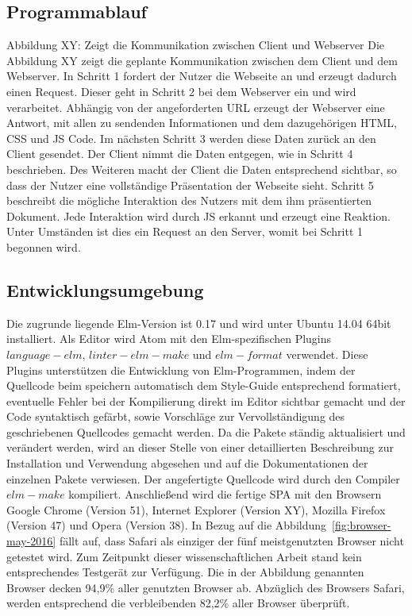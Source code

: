 \subsection{Programmablauf}
\label{sec:Programmablauf}
Abbildung XY: Zeigt die Kommunikation zwischen Client und Webserver
Die Abbildung XY zeigt die geplante Kommunikation zwischen dem Client und dem Webserver.
In Schritt 1 fordert der Nutzer die Webseite an und erzeugt dadurch einen Request. Dieser geht in Schritt 2 bei dem Webserver ein und wird verarbeitet. Abhängig von der angeforderten URL erzeugt der Webserver eine Antwort, mit allen zu sendenden Informationen und dem dazugehörigen \ac{HTML}, \ac{CSS} und \ac{JS} Code. Im nächsten Schritt 3 werden diese Daten zurück an den Client gesendet. Der Client nimmt die Daten entgegen, wie in Schritt 4 beschrieben. Des Weiteren macht der Client die Daten entsprechend sichtbar, so dass der Nutzer eine vollständige Präsentation der Webseite sieht. Schritt 5 beschreibt die mögliche Interaktion des Nutzers mit dem ihm präsentierten Dokument. Jede Interaktion wird durch \ac{JS} erkannt und erzeugt eine Reaktion. Unter Umständen ist dies ein Request an den Server, womit bei Schritt 1 begonnen wird.


\subsection{Entwicklungsumgebung}
\label{sec:Entwicklungsumgebung}
Die zugrunde liegende Elm-Version ist 0.17 und wird unter Ubuntu 14.04 64bit installiert. Als Editor wird Atom mit den Elm-spezifischen Plugins $language-elm$, $linter-elm-make$ und $elm-format$ verwendet. Diese Plugins unterstützen die Entwicklung von Elm-Programmen, indem der Quellcode beim speichern automatisch dem Style-Guide entsprechend formatiert, eventuelle Fehler bei der Kompilierung direkt im Editor sichtbar gemacht und der Code syntaktisch gefärbt, sowie Vorschläge zur Vervollständigung des geschriebenen Quellcodes gemacht werden. Da die Pakete ständig aktualisiert und verändert werden, wird an dieser Stelle von einer detaillierten Beschreibung zur Installation und Verwendung abgesehen und auf die Dokumentationen der einzelnen Pakete verwiesen.
Der angefertigte Quellcode wird durch den Compiler $elm-make$ kompiliert.
Anschließend wird die fertige \ac{SPA} mit den Browsern Google Chrome (Version 51), Internet Explorer (Version XY), Mozilla Firefox (Version 47) und Opera (Version 38). In Bezug auf die Abbildung~\ref{fig:browser-may-2016} fällt auf, dass Safari als einziger der fünf meistgenutzten Browser nicht getestet wird. Zum Zeitpunkt dieser wissenschaftlichen Arbeit stand kein entsprechendes Testgerät zur Verfügung. Die in der Abbildung genannten Browser decken 94,9\% aller genutzten Browser ab. Abzüglich des Browsers Safari, werden entsprechend die verbleibenden 82,2\% aller Browser überprüft.


